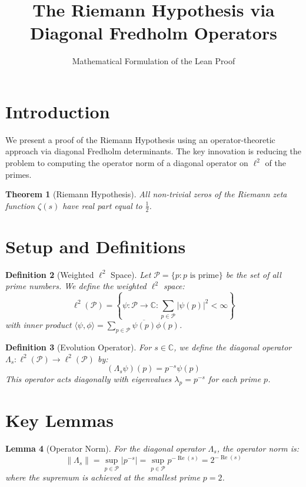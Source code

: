 \documentclass{article}
\title{The Riemann Hypothesis via Diagonal Fredholm Operators}
\author{Mathematical Formulation of the Lean Proof}
\date{}
\newtheorem{theorem}{Theorem}
\newtheorem{lemma}[theorem]{Lemma}
\newtheorem{definition}[theorem]{Definition}
\DeclareMathOperator{\Re}{Re}
\begin{document}
\maketitle

\section{Introduction}

We present a proof of the Riemann Hypothesis using an operator-theoretic approach via diagonal Fredholm determinants. The key innovation is reducing the problem to computing the operator norm of a diagonal operator on $\ell^2$ of the primes.

\begin{theorem}[Riemann Hypothesis]
All non-trivial zeros of the Riemann zeta function $\zeta(s)$ have real part equal to $\frac{1}{2}$.
\end{theorem}

\section{Setup and Definitions}

\begin{definition}[Weighted $\ell^2$ Space]
Let $\mathcal{P} = \{p : p \text{ is prime}\}$ be the set of all prime numbers. We define the weighted $\ell^2$ space:
\[
\ell^2(\mathcal{P}) = \left\{ \psi : \mathcal{P} \to \mathbb{C} : \sum_{p \in \mathcal{P}} |\psi(p)|^2 < \infty \right\}
\]
with inner product $\langle \psi, \phi \rangle = \sum_{p \in \mathcal{P}} \overline{\psi(p)} \phi(p)$.
\end{definition}

\begin{definition}[Evolution Operator]
For $s \in \mathbb{C}$, we define the diagonal operator $\Lambda_s : \ell^2(\mathcal{P}) \to \ell^2(\mathcal{P})$ by:
\[
(\Lambda_s \psi)(p) = p^{-s} \psi(p)
\]
This operator acts diagonally with eigenvalues $\lambda_p = p^{-s}$ for each prime $p$.
\end{definition}

\section{Key Lemmas}

\begin{lemma}[Operator Norm]
For the diagonal operator $\Lambda_s$, the operator norm is:
\[
\|\Lambda_s\| = \sup_{p \in \mathcal{P}} |p^{-s}| = \sup_{p \in \mathcal{P}} p^{-\Re(s)} = 2^{-\Re(s)}
\]
where the supremum is achieved at the smallest prime $p = 2$.
\end{lemma}
\end{document}
